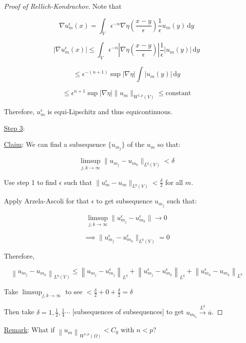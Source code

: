 \documentclass{article}
\theoremstyle{definition}
\begin{document}
\begin{proof}[Proof of Rellich-Kondrachov]
Note that 

\[
    \nabla u_m^{\epsilon} (x) = \int_V \epsilon ^{-n}\nabla \eta \left( \frac{x-y}{\epsilon} \right) \frac{1}{\epsilon}u_m(y)\, \mathrm{d}y
\]


\[
    \left\vert \nabla u_m^{\epsilon} (x) \right\vert \leq \int_V \epsilon^{-n} \left\vert \nabla \eta \left( \frac{x-y}{\epsilon } \right)  \right\vert \frac{1}{\epsilon } \vert u_m(y) \vert \, \mathrm{d}y
\]

\[
    \leq \epsilon^{-(n+1)} \sup \vert \nabla \eta \vert \int \vert u_m(y) \vert \, \mathrm{d}y
\]

\[
    \leq \epsilon^{n+1} \sup \vert \nabla \eta \vert \lVert u_m \rVert _{W^{1,p}(V)} \leq \text{constant} 
\]

Therefore, \(u_m^{\epsilon}\) is equi-Lipschitz and thus equicontinuous. 

\underline{Step 3}:

\underline{Claim}: We can find a subsequence \(\{ u_{m_j} \} \) of the \(u_m\) so that:

\[
    \limsup_{j,k \to \infty} \lVert u_{m_j} - u_{m_k} \rVert _{L^q(V)} < \delta
\]

Use step 1 to find \(\epsilon\) such that \(\lVert u_m ^ \epsilon - u_m \rVert _{L^q(V)} < \frac{\delta}{2}\) for all \(m\).

Apply Arzela-Ascoli for that \(\epsilon\) to get subsequence \(u_{m_j}\) such that:

\[
    \limsup_{j,k \to \infty} \lVert u_{m_j} ^ \epsilon - u_{m_k}^{\epsilon} \rVert \to 0 
\]

\[
    \implies \lVert u_{m_j}^{\epsilon} - u_{m_k}^{\epsilon } \rVert _ {L^q(V)} = 0
\]

Therefore,

\[
    \left\lVert u_{m_j} - u_{m_k} \right\rVert _{L^q(V)} \leq \left\lVert u_{m_j} - u_{m_j}^{\epsilon}  \right\rVert _ {L^q} + \left\lVert u_{m_j}^{\epsilon} - u_{m_k}^{\epsilon}   \right\rVert _ {L^q} + \left\lVert u_{m_k}^{\epsilon} - u_{m_k} \right\rVert _{L^q}
\]

Take \(\limsup_{j,k \to \infty} \) to see \(< \frac{\delta}{2} + 0 + \frac{\delta}{2} = \delta\) 

Then take \(\delta = 1, \frac{1}{2}, \frac{1}{4} \cdots \) [subsequences of subsequences] to get \(u_{m_{l_k}} \overset{L^q}{\to} \overline{u}\).

\end{proof}

\underline{Remark}: What if \(\left\lVert u_m \right\rVert _{W^{1,p}(\Omega)} < C_0\) with \(n < p\)?
\end{document}
